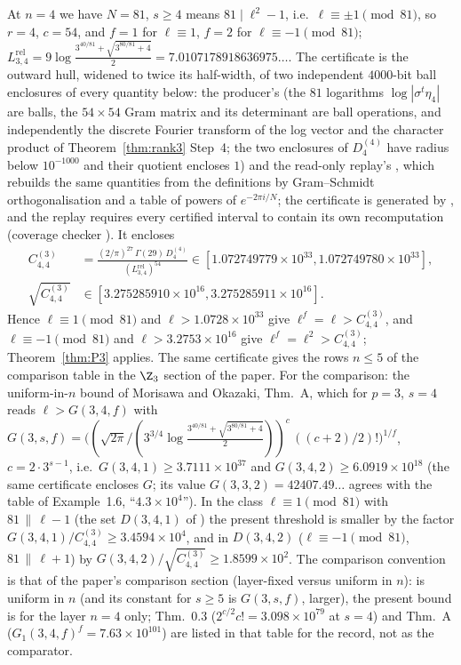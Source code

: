 At $n=4$ we have $N=81$, $s\ge4$ means $81\mid\ell^2-1$, i.e.\ $\ell\equiv\pm1\pmod{81}$, so $r=4$, $c=54$, and $f=1$ for $\ell\equiv1$, $f=2$ for $\ell\equiv-1\pmod{81}$; $L^{\mathrm{rel}}_{3,4}=9\log\frac{3^{40/81}+\sqrt{3^{80/81}+4}}2=7.0107178918636975\ldots$. The certificate \artPcert{} is the outward hull, widened to twice its half-width, of two independent $4000$-bit ball enclosures of every quantity below: the producer's (the $81$ logarithms $\log|\sigma^t\eta_4|$ are balls, the $54\times54$ Gram matrix and its determinant are ball operations, and independently the discrete Fourier transform of the log vector and the character product of Theorem~\ref{thm:rank3} Step~4; the two enclosures of $D_4^{(4)}$ have radius below $10^{-1000}$ and their quotient encloses $1$) and the read-only replay's \artPreplay{}, which rebuilds the same quantities from the definitions by Gram--Schmidt orthogonalisation and a table of powers of $e^{-2\pi i/N}$; the certificate is generated by \artPgen{}, and the replay requires every certified interval to contain its own recomputation (coverage checker \artPcover{}). It encloses
\begin{align*} C^{(3)}_{4,4}&=\frac{(2/\pi)^{27}\,\Gamma(29)\,D_4^{(4)}}{(L^{\mathrm{rel}}_{3,4})^{54}}\in[1.072749779\times10^{33},1.072749780\times10^{33}],\\ \sqrt{C^{(3)}_{4,4}}&\in[3.275285910\times10^{16},3.275285911\times10^{16}]. \end{align*}
Hence $\ell\equiv1\pmod{81}$ and $\ell>1.0728\times10^{33}$ give $\ell^{f}=\ell>C^{(3)}_{4,4}$, and $\ell\equiv-1\pmod{81}$ and $\ell>3.2753\times10^{16}$ give $\ell^{f}=\ell^2>C^{(3)}_{4,4}$; Theorem~\ref{thm:P3} applies. The same certificate gives the rows $n\le5$ of the comparison table in the $\Z_3$ section of the paper. For the comparison: the uniform-in-$n$ bound of Morisawa and Okazaki, \cite{MO16} Thm.~A, which for $p=3$, $s=4$ reads $\ell>G(3,4,f)$ with $G(3,s,f)=\big((\sqrt{2\pi}/(3^{3/4}\log\frac{3^{40/81}+\sqrt{3^{80/81}+4}}2))^{c}\,((c+2)/2)!\big)^{1/f}$, $c=2\cdot3^{s-1}$, i.e.\ $G(3,4,1)\ge3.7111\times10^{37}$ and $G(3,4,2)\ge6.0919\times10^{18}$ (the same certificate encloses $G$; its value $G(3,3,2)=42407.49\ldots$ agrees with the table of \cite{MO16} Example~1.6, ``$4.3\times10^4$''). In the class $\ell\equiv1\pmod{81}$ with $81\,\|\,\ell-1$ (the set $D(3,4,1)$ of \cite{MO16}) the present threshold is smaller by the factor $G(3,4,1)/C^{(3)}_{4,4}\ge3.4594\times10^{4}$, and in $D(3,4,2)$ ($\ell\equiv-1\pmod{81}$, $81\,\|\,\ell+1$) by $G(3,4,2)/\sqrt{C^{(3)}_{4,4}}\ge1.8599\times10^{2}$. The comparison convention is that of the paper's comparison section (layer-fixed versus uniform in $n$): \cite{MO16} is uniform in $n$ (and its constant for $s\ge5$ is $G(3,s,f)$, larger), the present bound is for the layer $n=4$ only; \cite{MO13} Thm.~0.3 ($2^{c/2}c!=3.098\times10^{79}$ at $s=4$) and Thm.~A ($G_1(3,4,f)^f=7.63\times10^{101}$) are listed in that table for the record, not as the comparator.

